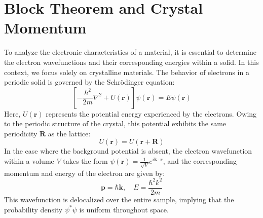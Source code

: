 \section{Block Theorem and Crystal Momentum}
To analyze the electronic characteristics of a material, it is essential to determine the electron wavefunctions and their corresponding energies within a solid. In this context, we focus solely on crystalline materials. The behavior of electrons in a periodic solid is governed by the Schrödinger equation:
\begin{equation*}
	\left[-\frac{\hbar^2}{2m} \nabla^2 + U(\mathbf{r})\right] \psi(\mathbf{r}) = E \psi(\mathbf{r})
\end{equation*}
Here, \( U(\mathbf{r}) \) represents the potential energy experienced by the electrons. Owing to the periodic structure of the crystal, this potential exhibits the same periodicity \( \mathbf{R} \) as the lattice:
\begin{equation*}
	U(\mathbf{r}) = U(\mathbf{r} + \mathbf{R})
\end{equation*}
In the case where the background potential is absent, the electron wavefunction within a volume \( V \) takes the form \( \psi(\mathbf{r}) = \frac{1}{\sqrt{V}} e^{i\mathbf{k} \cdot \mathbf{r}} \), and the corresponding momentum and energy of the electron are given by:
\begin{equation*}
	\mathbf{p} = \hbar \mathbf{k}, \quad E = \frac{\hbar^2 k^2}{2m}
\end{equation*}
This wavefunction is delocalized over the entire sample, implying that the probability density \( \psi^* \psi \) is uniform throughout space.


